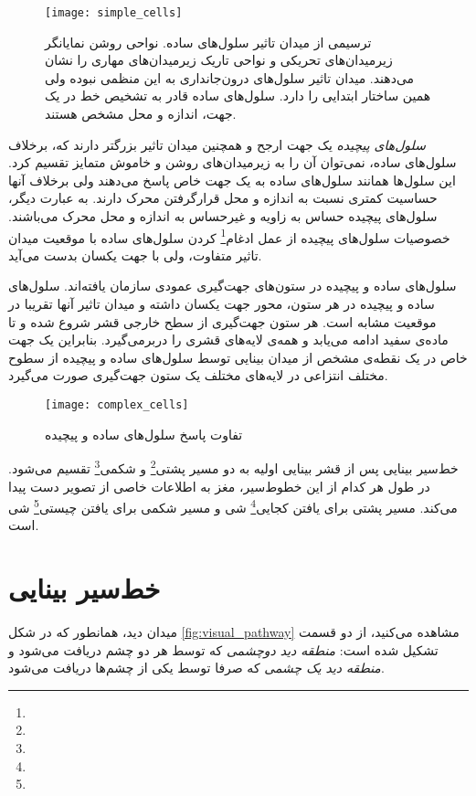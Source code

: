 \begin{figure}
\centering
{\footnotesize
\texttt{[image: simple\_cells]}
\caption[میدان تاثیر سلول‌های ساده]{ترسیمی از میدان تاثیر سلول‌های ساده. نواحی روشن نمایانگر زیرمیدان‌های تحریکی و نواحی تاریک زیرمیدان‌های مهاری را نشان می‌دهند. میدان تاثیر سلول‌های درون‌جانداری به این منظمی نبوده ولی همین ساختار ابتدایی را دارد. سلول‌های ساده قادر به تشخیص خط در یک جهت، اندازه و محل مشخص هستند.}
\label{fig:simple_cells}
}
\end{figure}

\textit{سلول‌های پیچیده} یک جهت ارجح و همچنین میدان تاثیر بزرگتر دارند که، برخلاف سلول‌های ساده، نمی‌توان آن را به زیرمیدان‌های روشن و خاموش متمایز تقسیم کرد. این سلول‌ها همانند سلول‌های ساده به یک جهت خاص پاسخ می‌دهند ولی برخلاف آنها حساسیت کمتری نسبت به اندازه و محل قرارگرفتن محرک دارند. به عبارت دیگر، سلول‌های پیچیده حساس به زاویه و غیرحساس به اندازه و محل محرک می‌باشند. خصوصیات سلول‌های پیچیده از عمل ادغام\footnote{} کردن سلول‌های ساده با موقعیت میدان تاثیر متفاوت، ولی با جهت یکسان بدست می‌آید. 

سلول‌های ساده و پیچیده در ستون‌های جهت‌گیری عمودی سازمان یافته‌اند. سلول‌های ساده و پیچیده در هر ستون، محور جهت یکسان داشته و میدان تاثیر آنها تقریبا در موقعیت مشابه است. هر ستون جهت‌گیری از سطح خارجی قشر شروع شده و تا ماده‌ی سفید ادامه می‌یابد و همه‌ی لایه‌های قشری را دربرمی‌گیرد. بنابراین یک جهت خاص در یک نقطه‌ی مشخص از میدان بینایی توسط سلول‌های ساده و پیچیده از سطوح مختلف انتزاعی در لایه‌های مختلف یک ستون جهت‌گیری صورت می‌گیرد.

\begin{figure}
\centering
{\footnotesize
\texttt{[image: complex\_cells]}
\caption{تفاوت پاسخ سلول‌های ساده و پیچیده}
\label{fig:complex_cells}
}
\end{figure}

خط‌سیر بینایی پس از قشر بینایی اولیه به دو مسیر پشتی\footnote{} و شکمی\footnote{} تقسیم می‌شود. در طول هر کدام از این خطوط‌سیر، مغز به اطلاعات خاصی از تصویر دست پیدا می‌کند. مسیر پشتی برای یافتن کجایی\footnote{} شی و مسیر شکمی برای یافتن چیستی\footnote{} شی است. 

\section{خط‌سیر بینایی}
میدان دید، همانطور که در شکل \ref{fig:visual_pathway} مشاهده می‌کنید، از دو قسمت تشکیل شده است: \textit{منطقه دید دوچشمی} که توسط هر دو چشم دریافت می‌شود و \textit{منطقه دید یک چشمی} که صرفا توسط یکی از چشم‌ها دریافت می‌شود. 

